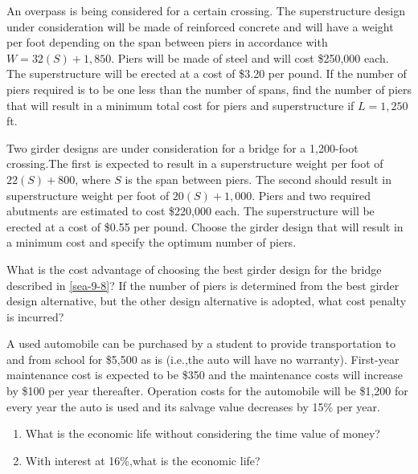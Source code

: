 \begin{exercises}
    \begin{exercise}
    \label{sea-9-7}
        An overpass is being considered for a certain crossing. The superstructure design under consideration will be made of reinforced concrete and will have a weight per foot depending on the span between piers in accordance with $W=32(S)+1,850$. Piers will be made of steel and will cost \$250,000 each. The superstructure will be erected at a cost of \$3.20 per pound. If the number of piers required is to be one less than the number of spans, find the number of piers that will result in a minimum total cost for piers and superstructure if $L=1,250$ft. 
    \end{exercise}
    \begin{solution}
    \end{solution}
    
    \begin{exercise}
    \label{sea-9-8}
        Two girder designs are under consideration for a bridge for a 1,200-foot crossing.The first is expected to result in a superstructure weight per foot of $22(S)+800$, where $S$ is the span between piers. The second should result in superstructure weight per foot of $20(S)+1,000$. Piers and two required abutments are estimated to cost \$220,000 each. The superstructure will be erected at a cost of \$0.55 per pound. Choose the girder design that will result in a minimum cost and specify the optimum number of piers.
    \end{exercise}
    \begin{solution}
    \end{solution}
    
    \begin{exercise}
    \label{sea-9-9}
        What is the cost advantage of choosing the best girder design for the bridge described in \ref{sea-9-8}? If the number of piers is determined from the best girder design alternative, but the other design alternative is adopted, what cost penalty is incurred?
    \end{exercise}
    \begin{solution}
    \end{solution}
    
    \begin{exercise}
    \label{sea-9-10}
        A used automobile can be purchased by a student to provide transportation to and from school for \$5,500 as is (i.e.,the auto will have no warranty). First-year maintenance cost is expected to be \$350 and the maintenance costs will increase by \$100 per year thereafter. Operation costs for the automobile will be \$1,200 for every year the auto is used and its salvage value decreases by 15\% per year.
        \begin{enumerate}[label=\alph*)]
            \item What is the economic life without considering the time value of money?
            \item With interest at 16\%,what is the economic life?
        \end{enumerate}
    \end{exercise}
    \begin{solution}
    \end{solution}
\end{exercises}
